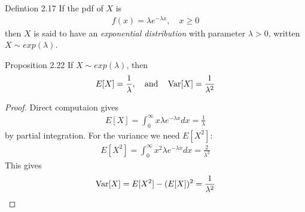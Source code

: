 \begin{boks}{Defintion 2.17}
  If the pdf of $X$ is
  \begin{align*}
    f(x) = \lambda e^{-\lambda x}, \quad x \geq 0
  \end{align*}
  then $X$ is said to have an \textit{exponential distribution} with parameter $\lambda > 0$, written $X \sim exp(\lambda)$.
\end{boks}

\begin{boks}{Proposition 2.22}
  If $X \sim exp(\lambda)$, then
  \begin{align*}
    E[X] = \frac{1}{\lambda}, \quad \text{and} \quad \operatorname{Var}[X] = \frac{1}{\lambda^2}
  \end{align*}
\end{boks}
\begin{proof}
  Direct computaion gives
  \begin{align*}
    E[X] = \int_0^\infty x \lambda e^{-\lambda x}dx = \frac{1}{\lambda}
  \end{align*}
  by partial integration. For the variance we need $E[X^2]$:
  \begin{align*}
    E[X^2] = \int_0^\infty x^2 \lambda e^{-\lambda x}dx = \frac{2}{\lambda^2}
  \end{align*}
  This gives
  \begin{align*}
    \operatorname{Var}[X] = E[X^2] - (E[X])^2 = \frac{1}{\lambda^2}
  \end{align*}
\end{proof}
